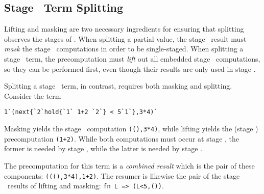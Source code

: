 



\subsection{Stage \bbone\ Term Splitting}

Lifting and masking are two necessary ingredients for ensuring that splitting
observes the stages of \lang. When splitting a partial value, the stage \bbone\
result must \emph{mask} the stage \bbtwo\ computations in order to be
single-staged. When splitting a stage \bbtwo\ term, the precomputation must
\emph{lift} out all embedded stage \bbone\ computations, so they can be
performed first, even though their results are only used in stage \bbtwo.

Splitting a stage \bbone\ term, in contrast, requires both masking and splitting.
Consider the term 
\begin{lstlisting}
1`(next{`2`hold{`1` 1+2 `2`} < 5`1`},3*4)`
\end{lstlisting}
Masking yields the stage \bbone\ computation \verb|((),3*4)|, while lifting
yields the (stage \bbone) precomputation \verb|(1+2)|. While both computations
must occur at stage \bbone, the former is needed by stage \bbone, while the
latter is needed by stage \bbtwo.

The precomputation for this term is a \emph{combined result} which is
the pair of these components: \verb|(((),3*4),1+2)|. The resumer is
likewise the pair of the stage \bbtwo\ results of lifting and masking:
\verb|fn L => (L<5,())|.

